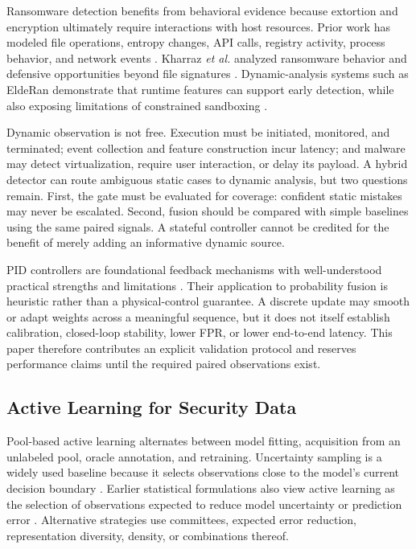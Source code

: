 Ransomware detection benefits from behavioral evidence because extortion and
encryption ultimately require interactions with host resources. Prior work has
modeled file operations, entropy changes, API calls, registry activity, process
behavior, and network events \cite{alrimy2018survey,kok2019ransomware,
bacci2021ransomware}. Kharraz \emph{et al.} analyzed ransomware behavior and
defensive opportunities beyond file signatures \cite{kharraz2015cutting}.
Dynamic-analysis systems such as EldeRan demonstrate that runtime features can
support early detection, while also exposing limitations of constrained
sandboxing \cite{sgandurra2016automated}.

Dynamic observation is not free. Execution must be initiated, monitored, and
terminated; event collection and feature construction incur latency; and malware
may detect virtualization, require user interaction, or delay its payload. A
hybrid detector can route ambiguous static cases to dynamic analysis, but two
questions remain. First, the gate must be evaluated for coverage: confident
static mistakes may never be escalated. Second, fusion should be compared with
simple baselines using the same paired signals. A stateful controller cannot be
credited for the benefit of merely adding an informative dynamic source.

PID controllers are foundational feedback mechanisms with well-understood
practical strengths and limitations \cite{astrom2001future}. Their application to
probability fusion is heuristic rather than a physical-control guarantee. A
discrete update may smooth or adapt weights across a meaningful sequence, but it
does not itself establish calibration, closed-loop stability, lower FPR, or lower
end-to-end latency. This paper therefore contributes an explicit validation
protocol and reserves performance claims until the required paired observations
exist.

\subsection{Active Learning for Security Data}

Pool-based active learning alternates between model fitting, acquisition from an
unlabeled pool, oracle annotation, and retraining. Uncertainty sampling is a
widely used baseline because it selects observations close to the model's current
decision boundary \cite{settles2009active}. Earlier statistical formulations also
view active learning as the selection of observations expected to reduce model
uncertainty or prediction error \cite{cohn1996active}. Alternative strategies use
committees, expected error reduction, representation diversity, density, or
combinations thereof.

